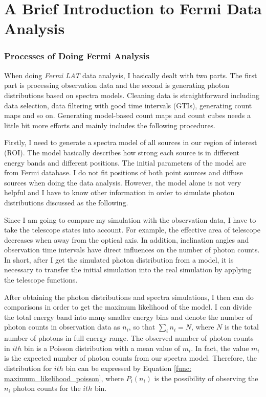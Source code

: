 \documentclass[12pt]{report}
\begin{document}
  \section{A Brief Introduction to Fermi Data Analysis}
    \subsubsection{Processes of Doing Fermi Analysis}
      When doing \textit{Fermi LAT} data analysis, I basically dealt with two parts. The 
      first part is processing observation data and the second is generating photon 
      distributions based on spectra models. Cleaning data is straightforward including data 
      selection, data filtering with good time intervals (GTIs), generating count maps 
      and so on. Generating model-based count maps and count cubes needs a little bit 
      more efforts and mainly includes the following procedures. 

      Firstly, I need to generate a spectra model of all sources in our region of 
      interest (ROI). The model basically describes how strong each source is in 
      different energy bands and different positions. The initial parameters of the 
      model are from Fermi database. I do not fit positions of both point sources and 
      diffuse sources when doing the data analysis. However, the model alone is not very 
      helpful and I have to know other information in order to simulate photon 
      distributions discussed as the following.

      Since I am going to compare my simulation with the observation data, I have to take 
      the telescope states into account. For example, the effective area of telescope 
      decreases when away from the optical axis. In addition, inclination angles and 
      observation time intervals have direct influences on the number of photon counts. 
      In short, after I get the simulated photon distribution from a model, it is 
      necessary to transfer the initial simulation into the real simulation by applying 
      the telescope functions. 
          
      After obtaining the photon distributions and spectra simulations, I then can do 
      comparisons in order to get the maximum likelihood of the model. I can divide the 
      total energy band into many smaller energy bins and denote
      the number of photon counts in observation data as $n_{i}$, so that 
      $\sum_{i}^{}n_{i} = N$, where $N$ is the total number of photons in full energy range. 
      The observed number of photon counts in $ith$ bin is a Poisson distribution with a 
      mean value of $m_{i}$. In fact, the value $m_{i}$ is the expected number of photon counts 
      from our spectra model. Therefore, the distribution for $ith$
      bin can be expressed by Equation \ref{func: maximum_likelihood_poisson}, where 
      $P_{i}\left(n_{i}\right)$ is the possibility of observing the $n_{i}$ photon counts 
      for the $ith$ bin. 
\end{document}
